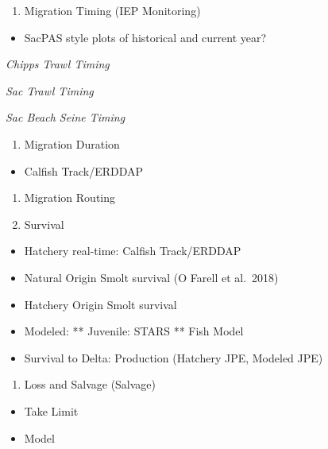\documentclass[
]{book}
\providecommand{\tightlist}{%
  \setlength{\itemsep}{0pt}\setlength{\parskip}{0pt}}
\theoremstyle{definition}
\theoremstyle{definition}
\theoremstyle{definition}
\theoremstyle{definition}
\theoremstyle{remark}
\begin{document}
\begin{enumerate}
\def\labelenumi{\arabic{enumi}.}
\setcounter{enumi}{2}
\tightlist
\item
  Migration Timing (IEP Monitoring)
\end{enumerate}

\begin{itemize}
\tightlist
\item
  SacPAS style plots of historical and current year?
\end{itemize}

\emph{Chipps Trawl Timing}

\emph{Sac Trawl Timing}

\emph{Sac Beach Seine Timing}

\begin{enumerate}
\def\labelenumi{\arabic{enumi}.}
\setcounter{enumi}{3}
\tightlist
\item
  Migration Duration
\end{enumerate}

\begin{itemize}
\tightlist
\item
  Calfish Track/ERDDAP
\end{itemize}

\begin{enumerate}
\def\labelenumi{\arabic{enumi}.}
\setcounter{enumi}{4}
\item
  Migration Routing
\item
  Survival
\end{enumerate}

\begin{itemize}
\tightlist
\item
  Hatchery real-time: Calfish Track/ERDDAP
\item
  Natural Origin Smolt survival (O Farell et al.~2018)
\item
  Hatchery Origin Smolt survival
\item
  Modeled: ** Juvenile: STARS ** Fish Model
\item
  Survival to Delta: Production (Hatchery JPE, Modeled JPE)
\end{itemize}

\begin{enumerate}
\def\labelenumi{\arabic{enumi}.}
\setcounter{enumi}{6}
\tightlist
\item
  Loss and Salvage (Salvage)
\end{enumerate}

\begin{itemize}
\tightlist
\item
  Take Limit
\item
  Model
\end{itemize}
\end{document}
